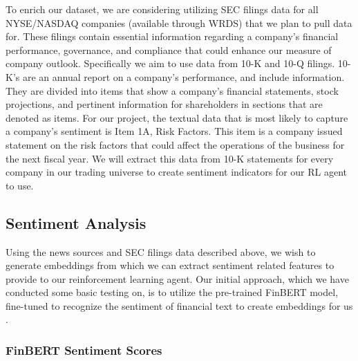 To enrich our dataset, we are considering utilizing SEC filings data for all 
NYSE/NASDAQ companies (available through WRDS) that we plan to pull data for. 
These filings contain essential information regarding a company's financial 
performance, governance, and compliance that could enhance our measure of 
company outlook. Specifically we aim to use data from 10-K and 10-Q filings. 
10-K’s are an annual report on a company’s performance, and include information. 
They are divided into items that show a company’s financial statements, 
stock projections, and pertinent information for shareholders in sections that 
are denoted as items. For our project, the textual data that is most likely to 
capture a company’s sentiment is Item 1A, Risk Factors. This item is a company 
issued statement on the risk factors that could affect the operations of the 
business for the next fiscal year. We will extract this data from 10-K statements 
for every company in our trading universe to create sentiment indicators for our 
RL agent to use. 

\subsection{Sentiment Analysis}

Using the news sources and SEC filings data described above, we wish to 
generate embeddings from which we can extract sentiment related features 
to provide to our reinforcement learning agent. Our initial approach, which 
we have conducted some basic testing on, is to utilize the pre-trained 
FinBERT model, fine-tuned to recognize the sentiment of financial text to 
create embeddings for us \cite{finbert}. 

\subsubsection{FinBERT Sentiment Scores}

